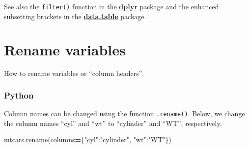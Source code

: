 \documentclass[
]{book}
\newenvironment{Shaded}{\begin{snugshade}}{\end{snugshade}}
\newcommand{\NormalTok}[1]{#1}
\newcommand{\OperatorTok}[1]{\textcolor[rgb]{0.81,0.36,0.00}{\textbf{#1}}}
\newcommand{\StringTok}[1]{\textcolor[rgb]{0.31,0.60,0.02}{#1}}
\begin{document}
See also the \texttt{filter()} function in the \href{https://dplyr.tidyverse.org/}{\textbf{dplyr}} package and the enhanced subsetting brackets in the \href{https://rdatatable.gitlab.io/data.table/}{\textbf{data.table}} package.

\hypertarget{rename-variables}{%
\section{Rename variables}\label{rename-variables}}

How to rename variables or ``column headers''.

\hypertarget{python-20}{%
\subsubsection*{Python}\label{python-20}}

Column names can be changed using the function \texttt{.rename()}. Below, we change the column names ``cyl'' and ``wt'' to ``cylinder'' and ``WT'', respectively.

\begin{Shaded}
\begin{Highlighting}[]
\NormalTok{mtcars.rename(columns}\OperatorTok{=}\NormalTok{\{}\StringTok{"cyl"}\NormalTok{:}\StringTok{"cylinder"}\NormalTok{, }\StringTok{"wt"}\NormalTok{:}\StringTok{"WT"}\NormalTok{\})}
\end{Highlighting}
\end{Shaded}
\end{document}
